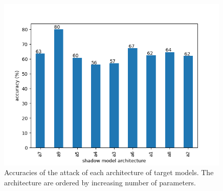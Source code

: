 \documentclass[11pt]{article}
\begin{document}
\begin{figure}[h!]
    \centering
    \begin{minipage}{\textwidth}
        \centering
        \includegraphics[width=0.99\textwidth]{accuracies.png} %
        \caption{Accuracies of the attack of each architecture of target models. The architecture are ordered by increasing number of parameters.}
        \label{accuracies}
    \end{minipage}\hfill
\end{figure}

\newpage
%


\end{document}
